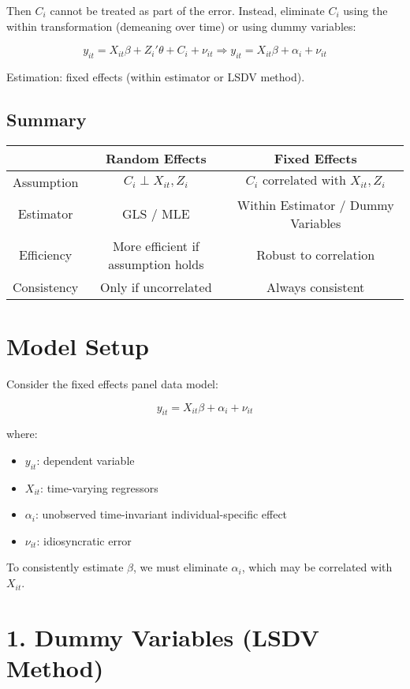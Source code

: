 \documentclass[12pt, oneside]{article}
\begin{document}
Then \( C_i \) cannot be treated as part of the error. Instead, eliminate \( C_i \) using the within transformation (demeaning over time) or using dummy variables:

\[
y_{it} = X_{it} \beta + Z_i' \theta + C_i + \nu_{it}
\Rightarrow
y_{it} = X_{it} \beta + \alpha_i + \nu_{it}
\]

Estimation: fixed effects (within estimator or LSDV method).

\subsection*{Summary}

\begin{center}
\begin{tabular}{|c|c|c|}
\hline
 & Random Effects & Fixed Effects \\
\hline
Assumption & \( C_i \perp X_{it}, Z_i \) & \( C_i \text{ correlated with } X_{it}, Z_i \) \\
\hline
Estimator & GLS / MLE & Within Estimator / Dummy Variables \\
\hline
Efficiency & More efficient if assumption holds & Robust to correlation \\
\hline
Consistency & Only if uncorrelated & Always consistent \\
\hline
\end{tabular}
\end{center}
\section*{Model Setup}

Consider the fixed effects panel data model:

\[
y_{it} = X_{it} \beta + \alpha_i + \nu_{it}
\]

where:
\begin{itemize}
  \item \( y_{it} \): dependent variable
  \item \( X_{it} \): time-varying regressors
  \item \( \alpha_i \): unobserved time-invariant individual-specific effect
  \item \( \nu_{it} \): idiosyncratic error
\end{itemize}

To consistently estimate \( \beta \), we must eliminate \( \alpha_i \), which may be correlated with \( X_{it} \).

\section*{1. Dummy Variables (LSDV Method)}
\end{document}

